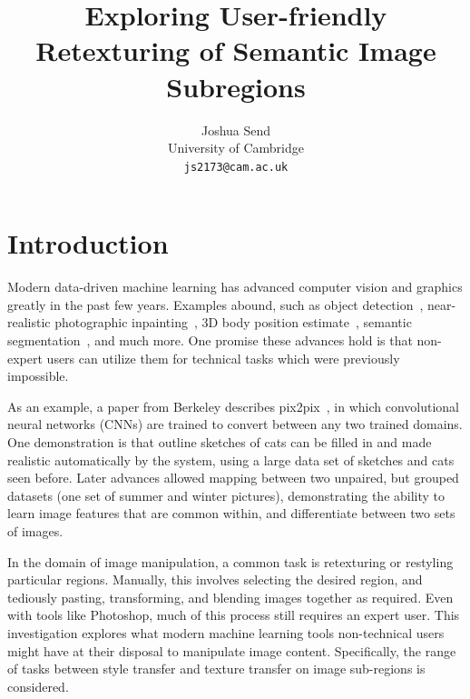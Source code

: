 \documentclass[10pt,twocolumn,letterpaper]{article}
\begin{document}
\title{Exploring User-friendly Retexturing of Semantic Image Subregions}

\author{Joshua Send \\
University of Cambridge \\
{\tt\small js2173@cam.ac.uk}
}

\maketitle


\begin{abstract}

\end{abstract}

\section{Introduction}

Modern data-driven machine learning has advanced computer vision and graphics greatly in the past few years. Examples abound, such as object detection~\cite{ren2015faster}, near-realistic photographic inpainting~\cite{li2017context}, 3D body position estimate~\cite{mehta2017vnect}, semantic segmentation~\cite{long2015fully}, and much more. One promise these advances hold is that non-expert users can utilize them for technical tasks which were previously impossible. 

As an example, a paper from Berkeley describes pix2pix~\cite{isola2017image}, in which convolutional neural networks (CNNs) are trained to convert between any two trained domains. One demonstration is that outline sketches of cats can be filled in and made realistic automatically by the system, using a large data set of sketches and cats seen before. Later advances allowed mapping between two unpaired, but grouped datasets (\eg one set of summer and winter pictures), demonstrating the ability to learn image features that are common within, and differentiate between two sets of images.

In the domain of image manipulation, a common task is retexturing or restyling particular regions. Manually, this involves selecting the desired region, and tediously pasting, transforming, and blending images together as required. Even with tools like Photoshop, much of this process still requires an expert user. This investigation explores what modern machine learning tools non-technical users might have at their disposal to manipulate image content. Specifically, the range of tasks between style transfer and texture transfer on image sub-regions is considered.
\end{document}
